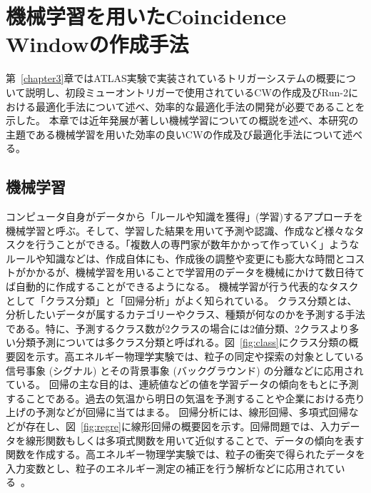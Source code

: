\chapter{機械学習を用いたCoincidence Windowの作成手法}\label{chapter4}
第~\ref{chapter3}章ではATLAS実験で実装されているトリガーシステムの概要について説明し、初段ミューオントリガーで使用されているCWの作成及びRun-2における最適化手法について述べ、効率的な最適化手法の開発が必要であることを示した。
本章では近年発展が著しい機械学習についての概説を述べ、本研究の主題である機械学習を用いた効率の良いCWの作成及び最適化手法について述べる。

\section{機械学習}\label{回帰分析}
コンピュータ自身がデータから「ルールや知識を獲得」(学習)するアプローチを機械学習と呼ぶ。そして、学習した結果を用いて予測や認識、作成など様々なタスクを行うことができる。「複数人の専門家が数年かかって作っていく」ようなルールや知識などは、作成自体にも、作成後の調整や変更にも膨大な時間とコストがかかるが、機械学習を用いることで学習用のデータを機械にかけて数日待てば自動的に作成することができるようになる\cite{book:DL}。
機械学習が行う代表的なタスクとして「クラス分類」と「回帰分析」がよく知られている。
クラス分類とは、分析したいデータが属するカテゴリーやクラス、種類が何なのかを予測する手法である。特に、予測するクラス数が2クラスの場合には2値分類、2クラスより多い分類予測については多クラス分類と呼ばれる。図~\ref{fig:class}にクラス分類の概要図を示す。高エネルギー物理学実験では、粒子の同定や探索の対象としている信号事象 (シグナル) とその背景事象 (バックグラウンド) の分離などに応用されている。
回帰の主な目的は、連続値などの値を学習データの傾向をもとに予測することである。過去の気温から明日の気温を予測することや企業における売り上げの予測などが回帰に当てはまる。
回帰分析には、線形回帰、多項式回帰などが存在し、図~\ref{fig:regre}に線形回帰の概要図を示す。回帰問題では、入力データを線形関数もしくは多項式関数を用いて近似することで、データの傾向を表す関数を作成する。高エネルギー物理学実験では、粒子の衝突で得られたデータを入力変数とし、粒子のエネルギー測定の補正を行う解析などに応用されている~\cite{Sirunyan:2747266}。

